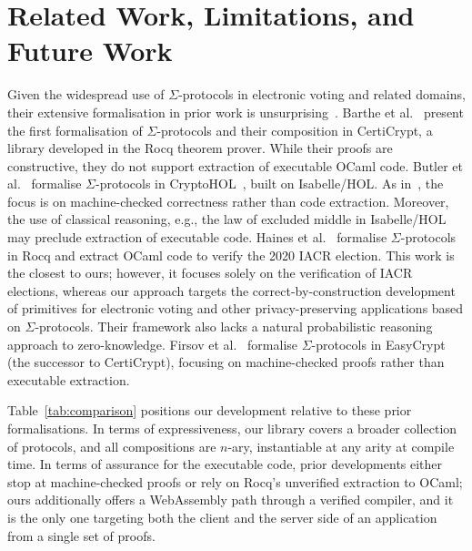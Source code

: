 \documentclass[sigconf,anonymous,review]{acmart}
\begin{document}
\section{Related Work, Limitations, and Future Work}\label{rel_work}
Given the widespread use of $\Sigma$-protocols in electronic voting and related domains, their extensive formalisation in prior work is unsurprising~\cite{5552642,9519460,butler2021formalising,10.1145/3319535.3354247,287095,almeida2010certifying,10221929,10.1145/3594735}.  Barthe et al.~\cite{5552642} present the first formalisation of $\Sigma$-protocols and their composition in CertiCrypt, a library developed in the Rocq theorem prover. While their proofs are constructive, they do not support extraction of executable OCaml code. Butler et al.~\cite{butler2021formalising} formalise $\Sigma$-protocols in CryptoHOL~\cite{10.1007/978-3-662-49498-1_20}, built on Isabelle/HOL. As in~\cite{5552642}, the focus is on machine-checked correctness rather than code extraction. Moreover, the use of classical reasoning, e.g., the law of excluded middle in Isabelle/HOL may preclude extraction of executable code. Haines et al.~\cite{287095} formalise $\Sigma$-protocols in Rocq and extract OCaml code to verify the 2020 IACR election. This work is the closest to ours; however, it focuses solely on the verification of IACR elections, whereas our approach targets the correct-by-construction development of primitives for electronic voting and other privacy-preserving applications based on $\Sigma$-protocols. Their framework also lacks a natural probabilistic reasoning approach to zero-knowledge. Firsov et al.~\cite{10221929} formalise $\Sigma$-protocols in EasyCrypt (the successor to CertiCrypt), focusing on machine-checked proofs rather than executable extraction. 

  
Table~\ref{tab:comparison} positions our development relative to these prior formalisations. In terms of expressiveness, our library covers a broader collection of protocols, and all compositions are $n$-ary, instantiable at any arity at compile time. In terms of assurance for the executable code, prior developments either stop at machine-checked proofs or rely on Rocq's unverified extraction to OCaml; ours additionally offers a WebAssembly path through a verified compiler, and it is the only one targeting both the client and the server side of an application from a single set of proofs.
\end{document}
